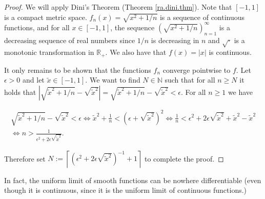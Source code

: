 \begin{proof}

We will apply Dini's Theorem (Theorem \ref{ra.dini.thm}). Note that \([-1,1]\) is a compact metric space. \(f_n(x) = \sqrt{x^2 + 1/n}\) is a sequence of continuous functions, and for all \(x \in [-1,1]\), the sequence $( \sqrt{x^2 + 1/n})_{n=1}^{\infty}$ is a decreasing sequence of real numbers since \(1/n\) is decreasing in \(n\) and \(\sqrt{\cdot}\) is a monotonic transformation in \(\mathbb{R}_+\). We also have that \(f(x) = |x|\) is continuous. 

It only remains to be shown that  the functions $f_n$ converge pointwise to \(f\). Let \(\epsilon > 0\) and let \(\tilde{x} \in [-1,1]\). We want to find \(N \in \mathbb{N}\) such that for all \(n \geq N\) it holds that \(\left|    \sqrt{\tilde{x}^2 + 1/n} - \sqrt{\tilde{x}^2}  \right| =    \sqrt{\tilde{x}^2 + 1/n} - \sqrt{\tilde{x}^2} < \epsilon\). For all \(n \geq 1\) we have



\begin{multline*}
 \sqrt{\tilde{x}^2 + 1/n} - \sqrt{\tilde{x}^2} < \epsilon \iff   \tilde{x}^2 + \frac{1}{n} <  \left( \epsilon + \sqrt{\tilde{x}^2}  \right)^2 \iff  \frac{1}{n} < \epsilon^2 + 2 \epsilon \sqrt{\tilde{x}^2} + \tilde{x}^2 - \tilde{x}^2
 \\ \iff n > \frac{1}{\epsilon^2 + 2 \epsilon \sqrt{\tilde{x}^2}}.
\end{multline*}


Therefore set \(N := \left\lceil \left( \epsilon^2 + 2 \epsilon \sqrt{\tilde{x}^2} \right)^{-1}  + 1\right\rceil \) to complete the proof.

\end{proof}

In fact, the uniform limit of smooth functions can be nowhere differentiable (even though it is continuous, since it is the uniform limit of continuous functions.)

